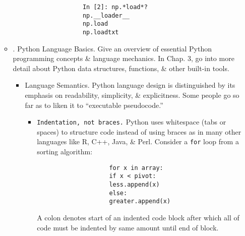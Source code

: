 \documentclass{article}
\begin{document}
\begin{itemize}
\begin{itemize}
\begin{itemize}
\begin{verbatim}
				In [2]: np.*load*?
				np.__loader__
				np.load
				np.loadtxt
			\end{verbatim}
		\end{itemize}
		\item {. Python Language Basics.} Give an overview of essential Python programming concepts \& language mechanics. In Chap. 3, go into more detail about Python data structures, functions, \& other built-in tools.
		\begin{itemize}
			\item {\sf Language Semantics.} Python language design is distinguished by its emphasis on readability, simplicity, \& explicitness. Some people go so far as to liken it to ``executable pseudocode.''
			\begin{itemize}
				\item {\tt Indentation, not braces.} Python uses whitespace (tabs or spaces) to structure code instead of using braces as in many other languages like R, C++, Java, \& Perl. Consider a {\tt for} loop from a sorting algorithm:
				\begin{verbatim}
					for x in array:
					if x < pivot:
					less.append(x)
					else:
					greater.append(x)
				\end{verbatim}
				A colon denotes start of an indented code block after which all of code must be indented by same amount until end of block.
				

\end{itemize}
\end{itemize}
\end{itemize}
\end{itemize}
\end{document}
